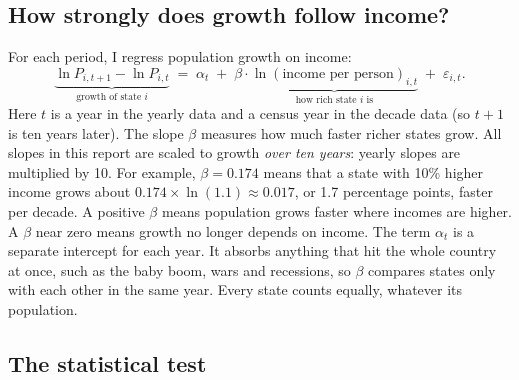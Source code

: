 \documentclass[11pt]{article}
\begin{document}
\subsection{How strongly does growth follow income?}

For each period, I regress population growth on income:
\begin{equation}
\underbrace{\ln P_{i,t+1} - \ln P_{i,t}}_{\text{growth of state } i}
  \;=\; \alpha_t \;+\; \beta \cdot \underbrace{\ln(\text{income per person})_{i,t}}_{\text{how rich state } i \text{ is}}
  \;+\; \varepsilon_{i,t}.
\label{eq:basic}
\end{equation}
Here $t$ is a year in the yearly data and a census year in the decade data (so $t+1$ is ten years
later). The slope $\beta$ measures how much faster richer states grow. All slopes in this report are
scaled to growth \emph{over ten years}: yearly slopes are multiplied by 10. For example,
$\beta = 0.174$ means that a state with 10\% higher income grows about
$0.174 \times \ln(1.1) \approx 0.017$, or 1.7 percentage points, faster per decade. A positive
$\beta$ means population grows faster where incomes are higher. A $\beta$ near zero means growth no
longer depends on income. The term $\alpha_t$ is a separate intercept for each year. It absorbs
anything that hit the whole country at once, such as the baby boom, wars and recessions, so $\beta$
compares states only with each other in the same year. Every state counts equally, whatever its
population.

\subsection{The statistical test}
\end{document}
